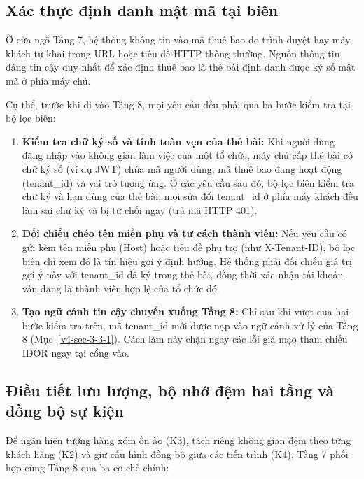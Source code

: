 \subsection{Xác thực định danh mật mã tại biên}\label{v4-sec-3-2-1}

Ở cửa ngõ Tầng 7, hệ thống không tin vào mã thuê bao do trình duyệt hay máy khách tự khai trong URL hoặc tiêu đề HTTP thông thường. Nguồn thông tin đáng tin cậy duy nhất để xác định thuê bao là thẻ bài định danh được ký số mật mã ở phía máy chủ.

Cụ thể, trước khi đi vào Tầng 8, mọi yêu cầu đều phải qua ba bước kiểm tra tại bộ lọc biên:

\begin{enumerate}
\def\labelenumi{\arabic{enumi}.}
\item
  \textbf{Kiểm tra chữ ký số và tính toàn vẹn của thẻ bài:} Khi người dùng đăng nhập vào không gian làm việc của một tổ chức, máy chủ cấp thẻ bài có chữ ký số (ví dụ JWT) chứa mã người dùng, mã thuê bao đang hoạt động (tenant\_\allowbreak{}id) và vai trò tương ứng. Ở các yêu cầu sau đó, bộ lọc biên kiểm tra chữ ký và hạn dùng của thẻ bài; mọi sửa đổi tenant\_\allowbreak{}id ở phía máy khách đều làm sai chữ ký và bị từ chối ngay (trả mã HTTP 401).
\item
  \textbf{Đối chiếu chéo tên miền phụ và tư cách thành viên:} Nếu yêu cầu có gửi kèm tên miền phụ (Host) hoặc tiêu đề phụ trợ (như X-Tenant-ID), bộ lọc biên chỉ xem đó là tín hiệu gợi ý định hướng. Hệ thống phải đối chiếu giá trị gợi ý này với tenant\_\allowbreak{}id đã ký trong thẻ bài, đồng thời xác nhận tài khoản vẫn đang là thành viên hợp lệ của tổ chức đó.
\item
  \textbf{Tạo ngữ cảnh tin cậy chuyển xuống Tầng 8:} Chỉ sau khi vượt qua hai bước kiểm tra trên, mã tenant\_\allowbreak{}id mới được nạp vào ngữ cảnh xử lý của Tầng 8 (Mục~\ref{v4-sec-3-3-1}). Cách làm này chặn ngay các lỗi giả mạo tham chiếu IDOR ngay tại cổng vào.
\end{enumerate}

\subsection{Điều tiết lưu lượng, bộ nhớ đệm hai tầng và đồng bộ sự kiện}\label{v4-sec-3-2-2}

Để ngăn hiện tượng hàng xóm ồn ào (K3), tách riêng không gian đệm theo từng khách hàng (K2) và giữ cấu hình đồng bộ giữa các tiến trình (K4), Tầng 7 phối hợp cùng Tầng 8 qua ba cơ chế chính:

